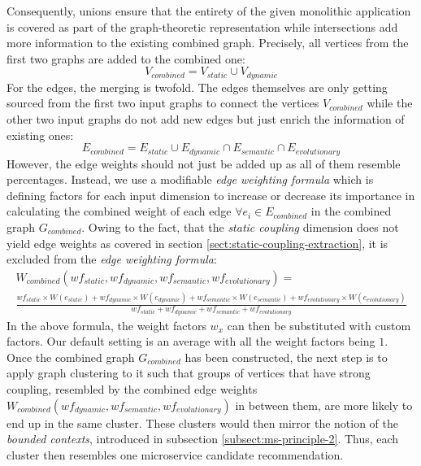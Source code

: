 \documentclass[12pt,a4paper]{report}
\begin{document}
Consequently, unions ensure that the entirety of the given monolithic
application is covered as part of the graph-theoretic representation while
intersections add more information to the existing combined graph. Precisely,
all vertices from the first two graphs are added to the combined one:
\[
  V_{combined} = V_{static} \cup V_{dynamic}
\]
For the edges, the merging is
twofold. The edges themselves are only getting sourced from the first two input
graphs to connect the vertices \(V_{combined}\) while the other two input
graphs do not add new edges but just enrich the information of existing ones:
\[
  E_{combined} = E_{static} \cup E_{dynamic} \cap E_{semantic} \cap E_{evolutionary}
\]
However, the edge weights should not just be added up as all
of them resemble percentages. Instead, we use a modifiable \textit{edge
weighting formula} which is defining factors for each input dimension to
increase or decrease its importance in calculating the combined weight of each
edge \(\forall e_i \in E_{combined}\) in the combined graph \(G_{combined}\).
Owing to the fact, that the \textit{static coupling} dimension does not yield
edge weights as covered in section \ref{sect:static-coupling-extraction}, it is
excluded from the \textit{edge weighting formula}:
\small
\begin{equation*}
\begin{split}
  W_{combined}(wf_{static}, wf_{dynamic}, wf_{semantic}, wf_{evolutionary}) = \\
  \frac{
    wf_{static} \times W(e_{static}) +
    wf_{dynamic} \times W(e_{dynamic}) +
    wf_{semantic} \times W(e_{semantic}) +
    wf_{evolutionary} \times W(e_{evolutionary})
  }{
    wf_{static} +
    wf_{dynamic} +
    wf_{semantic} +
    wf_{evolutionary}
  }
\end{split}
\end{equation*}
\normalsize
In the above formula, the weight factors \(w_x\) can then be substituted with custom
factors. Our default setting is an average with all the weight factors being \(1\).
\newline
Once the combined graph \(G_{combined}\) has been constructed,
the next step is to apply graph clustering to it such that groups of vertices
that have strong coupling, resembled by the combined edge weights
\(W_{combined}(wf_{dynamic}, wf_{semantic}, wf_{evolutionary})\) in between them,
are more likely to end up in the same cluster. These clusters would then mirror
the notion of the \textit{bounded contexts}, introduced in subsection
\ref{subsect:ms-principle-2}. Thus, each cluster then resembles one microservice
candidate recommendation.
\end{document}

